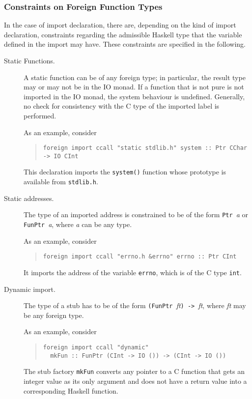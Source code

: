 \documentclass[a4paper,twoside]{article}
\newcommand{\code}[1]{\texttt{#1}}      %
\begin{document}
\subsubsection{Constraints on Foreign Function Types}

In the case of import declaration, there are, depending on the kind of import
declaration, constraints regarding the admissible Haskell type that the
variable defined in the import may have.  These constraints are specified in
the following.
%
\begin{description}
\item[Static Functions.]  A static function can be of any foreign type; in
  particular, the result type may or may not be in the IO monad.  If a
  function that is not pure is not imported in the IO monad, the system
  behaviour is undefined.  Generally, no check for consistency with the C type
  of the imported label is performed.

  As an example, consider
  \begin{quote}
\begin{verbatim}
foreign import ccall "static stdlib.h" system :: Ptr CChar -> IO CInt
\end{verbatim}
  \end{quote}
  This declaration imports the \code{system()} function whose prototype is
  available from \code{stdlib.h}.

\item[Static addresses.]  The type of an imported address is constrained to be
  of the form \code{Ptr }\textit{a} or \code{FunPtr }\textit{a}, where
  \textit{a} can be any type.

  As an example, consider
  \begin{quote}
\begin{verbatim}
foreign import ccall "errno.h &errno" errno :: Ptr CInt
\end{verbatim}
  \end{quote}
  It imports the address of the variable \code{errno}, which is of the C type
  \code{int}.

\item[Dynamic import.]  The type of a  stub has to be of the
  form \code{(FunPtr }\textit{ft}\code{) -> }\textit{ft}, where \textit{ft} may
  be any foreign type.

  As an example, consider
  \begin{quote}
\begin{verbatim}
foreign import ccall "dynamic" 
  mkFun :: FunPtr (CInt -> IO ()) -> (CInt -> IO ())
\end{verbatim}
  \end{quote}
  The stub factory \code{mkFun} converts any pointer to a C function that gets
  an integer value as its only argument and does not have a return value into
  a corresponding Haskell function.


\end{description}
\end{document}

